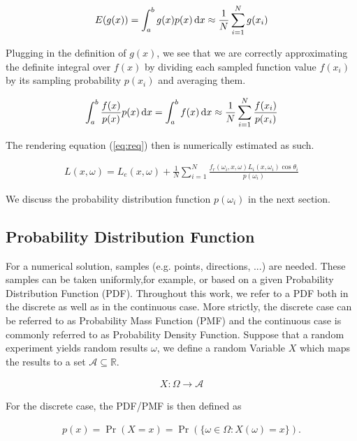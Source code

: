 \begin{align}
E(g(x)) = \int_a^b g(x)p(x)\mathop{}\!\mathrm{d} x \approx \frac{1}{N} \sum_{i=1}^{N} g(x_i) 
\end{align}

Plugging in the definition of $g(x)$, we see that we are correctly approximating the definite integral over $f(x)$ by dividing each sampled function value $f(x_i)$ by its sampling probability $p(x_i)$ and averaging them.

\begin{align}
\label{eq:mci}
\int_a^b \frac{f(x)}{p(x)}p(x)\mathop{}\!\mathrm{d} x = \int_a^b f(x) \mathop{}\!\mathrm{d} x \approx \frac{1}{N} \sum_{i=1}^{N} \frac{f(x_i)}{p(x_i)}
\end{align}


The rendering equation (\ref{eq:req}) then is numerically estimated as such.

\begin{align}
\label{eq:reqmc}
L(x, \omega) =  L_e(x, \omega) + \frac{1}{N} \sum_{i=1}^{N} \frac{f_r(\omega_i, x, \omega) L_i(x, \omega_i)\cos\theta_i}{p(\omega_i)}
\end{align}

We discuss the probability distribution function $p(\omega_i)$ in the next section. 

\subsection{Probability Distribution Function}
\label{sec:PDF}

For a numerical solution, samples (e.g. points, directions, ...) are needed. These samples can be taken  uniformly,for example, or based on a given Probability Distribution Function (PDF). Throughout this work, we refer to a PDF both in the discrete as well as in the continuous case. More strictly, the discrete case can be referred to as Probability Mass Function (PMF) and the continuous case is commonly referred to as Probability Density Function. Suppose that a random experiment yields random results $\omega$, we define a random Variable $X$ which maps the results to a set $\mathcal{A} \subseteq \mathbb{R}$.

\begin{align}
X: \Omega \rightarrow \mathcal{A}
\end{align}

For the discrete case, the PDF/PMF is then defined as

\begin{align}
p(x) = \Pr(X = x) = \Pr( \{\omega \in \Omega : X(\omega) = x \} ).
\end{align}

